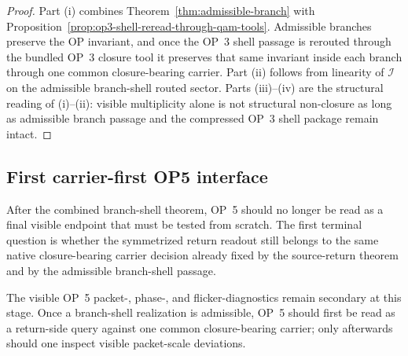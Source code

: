 \begin{proof}
Part (i) combines Theorem~\ref{thm:admissible-branch} with Proposition~\ref{prop:op3-shell-reread-through-qam-tools}. Admissible branches preserve the OP invariant, and once the OP~3 shell passage is rerouted through the bundled OP~3 closure tool it preserves that same invariant inside each branch through one common closure-bearing carrier. Part (ii) follows from linearity of $\mathcal{I}$ on the admissible branch-shell routed sector. Parts (iii)--(iv) are the structural reading of (i)--(ii): visible multiplicity alone is not structural non-closure as long as admissible branch passage and the compressed OP~3 shell package remain intact.
\end{proof}


\subsection{First carrier-first OP5 interface}
\label{sec:carrier-first-op5-interface}

After the combined branch-shell theorem, OP~5 should no longer be read as a final visible endpoint that must be tested from scratch. The first terminal question is whether the symmetrized return readout still belongs to the same native closure-bearing carrier decision already fixed by the source-return theorem and by the admissible branch-shell passage.

\begin{remark}
The visible OP~5 packet-, phase-, and flicker-diagnostics remain secondary at this stage. Once a branch-shell realization is admissible, OP~5 should first be read as a return-side query against one common closure-bearing carrier; only afterwards should one inspect visible packet-scale deviations.
\end{remark}

